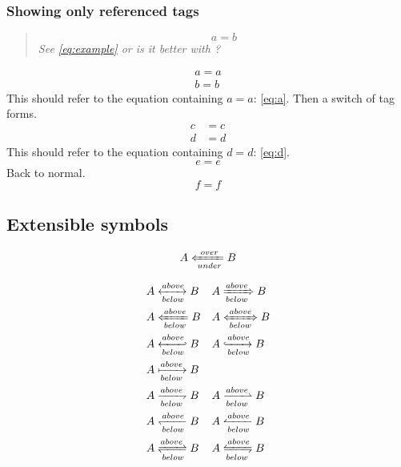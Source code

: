 \documentclass{article}
\begin{document}
\subsubsection{Showing only referenced tags}

\begin{quote}\renewcommand*\rmdefault{ppl}\normalfont\itshape
\begin{equation*}
  a=b \label{eq:example}\tag*{Q\&A}
\end{equation*}
See \ref{eq:example} or is it better with ?
\end{quote}

\begin{gather}
  a=a \label{eq:a} \\
  b=b \label{eq:b} \tag{**}
\end{gather}
This should refer to the equation containing $a=a$: \eqref{eq:a}.
Then a switch of tag forms.
\begin{align}
  c&=c \label{eq:c} \\
  d&=d \label{eq:d}
\end{align}
This should refer to the equation containing $d=d$: \eqref{eq:d}.
\begin{equation}
  e=e
\end{equation}
Back to normal.
\begin{equation}
  f=f
\end{equation}

\subsection{Extensible symbols}

\[
  A \xLeftarrow[under]{over} B
\]

\begin{align*}
  A &\xleftrightarrow[below]{above} B &
  A &\xRightarrow[below]{above} B \\
  A &\xLeftarrow[below]{above} B &
  A &\xLeftrightarrow[below]{above} B \\
  A &\xhookleftarrow[below]{above} B &
  A &\xhookrightarrow[below]{above} B \\
  A &\xmapsto[below]{above} B \\
  A &\xrightharpoondown[below]{above} B &
  A &\xrightharpoonup[below]{above} B \\
  A &\xleftharpoondown[below]{above} B &
  A &\xleftharpoonup[below]{above} B \\
  A &\xrightleftharpoons[below]{above} B &
  A &\xleftrightharpoons[below]{above} B \\
\end{align*}
\end{document}

